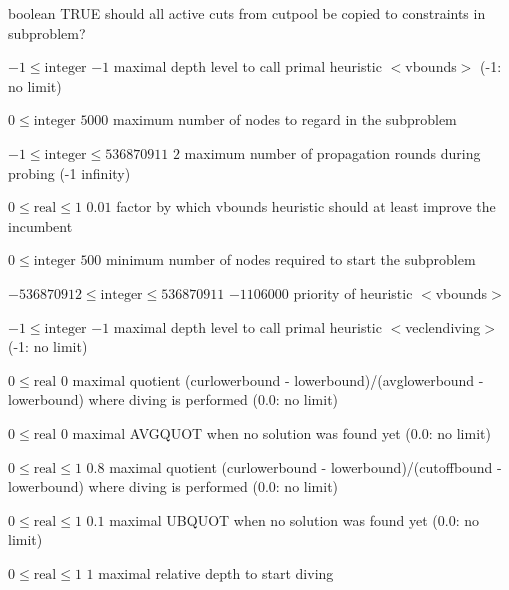 %
{boolean}%
{TRUE}%
{should all active cuts from cutpool be copied to constraints in subproblem?}%
{}

%
{$-1\leq\textrm{integer}$}%
{$-1$}%
{maximal depth level to call primal heuristic $<$vbounds$>$ (-1: no limit)}%
{}

%
{$0\leq\textrm{integer}$}%
{$5000$}%
{maximum number of nodes to regard in the subproblem}%
{}

%
{$-1\leq\textrm{integer}\leq536870911$}%
{$2$}%
{maximum number of propagation rounds during probing (-1 infinity)}%
{}

%
{$0\leq\textrm{real}\leq1$}%
{$0.01$}%
{factor by which vbounds heuristic should at least improve the incumbent}%
{}

%
{$0\leq\textrm{integer}$}%
{$500$}%
{minimum number of nodes required to start the subproblem}%
{}

%
{$-536870912\leq\textrm{integer}\leq536870911$}%
{$-1106000$}%
{priority of heuristic $<$vbounds$>$}%
{}

%
{$-1\leq\textrm{integer}$}%
{$-1$}%
{maximal depth level to call primal heuristic $<$veclendiving$>$ (-1: no limit)}%
{}

%
{$0\leq\textrm{real}$}%
{$0$}%
{maximal quotient (curlowerbound - lowerbound)/(avglowerbound - lowerbound) where diving is performed (0.0: no limit)}%
{}

%
{$0\leq\textrm{real}$}%
{$0$}%
{maximal AVGQUOT when no solution was found yet (0.0: no limit)}%
{}

%
{$0\leq\textrm{real}\leq1$}%
{$0.8$}%
{maximal quotient (curlowerbound - lowerbound)/(cutoffbound - lowerbound) where diving is performed (0.0: no limit)}%
{}

%
{$0\leq\textrm{real}\leq1$}%
{$0.1$}%
{maximal UBQUOT when no solution was found yet (0.0: no limit)}%
{}

%
{$0\leq\textrm{real}\leq1$}%
{$1$}%
{maximal relative depth to start diving}%
{}

